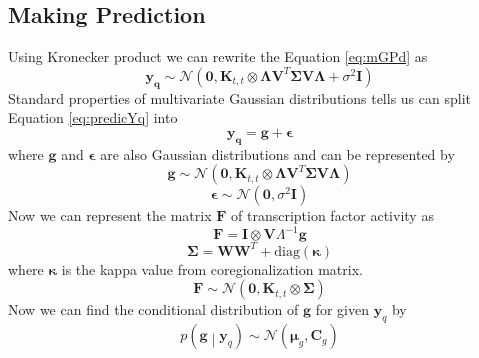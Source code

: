 \subsection{Making Prediction}
Using Kronecker product we can rewrite the Equation \ref{eq:mGPd} as
\begin{equation} \label{eq:predicYq}
\mathbf{y_q}  \sim \mathcal{N} \left( \mathbf{0}, 
\mathbf{K}_{t,t} \otimes \boldsymbol{\Lambda} \mathbf{V}^T\boldsymbol{\Sigma} \mathbf{V} \boldsymbol{\Lambda} +
\sigma^2\mathbf{I}\right)
\end{equation}
Standard properties of multivariate Gaussian distributions tells us can split Equation \ref{eq:predicYq} into
\begin{equation} \label{eq:gEp}
\mathbf{y_q} = \mathbf{g} + \boldsymbol{\epsilon}
\end{equation}
where $\mathbf{g}$ and $\boldsymbol{\epsilon}$ are also Gaussian distributions and can be represented by
\begin{equation}\label{eq:g}
\mathbf{g} \sim \mathcal{N} \left( \mathbf{0}, 
\mathbf{K}_{t,t} \otimes 
\boldsymbol{\Lambda} \mathbf{V}^T\boldsymbol{\Sigma} \mathbf{V} \boldsymbol{\Lambda} \right)
\end{equation}
\begin{equation}\label{eq:Epsi}
\boldsymbol{\epsilon} \sim \mathcal{N} \left(\mathbf{0},\sigma^2\mathbf{I}\right)
\end{equation}
Now we can represent the matrix $\mathbf{F}$ of transcription factor activity as
\begin{equation}\label{eq:F}
\mathbf{F} = \mathbf{I} \otimes \mathbf{V} \Lambda^{-1} \mathbf{g}
\end{equation}
\begin{equation}\label{eq:Sigma}
\boldsymbol{\Sigma} = \mathbf{W}\mathbf{W}^T + \text{diag}\left(\boldsymbol{\kappa}\right)
\end{equation}
where $\boldsymbol{\kappa}$ is the kappa value from coregionalization matrix.
\begin{equation} \label{eq:predictionF}
\mathbf{F}  \sim \mathcal{N} \left( \mathbf{0},\mathbf{K}_{t,t} \otimes \boldsymbol{\Sigma}\right)
\end{equation}
Now we can find the conditional distribution of $\mathbf{g}$ for given $\mathbf{y}_q$ by
\begin{equation}\label{eq:gGivenYq}
p\left(\mathbf{g} \middle| \mathbf{y}_q\right) \sim 
\mathcal{N} \left( \boldsymbol{\mu}_g, \mathbf{C}_g\right)
\end{equation}
